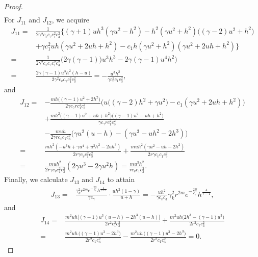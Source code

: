 \documentclass[10pt,a4paper]{amsart}
\begin{document}
\begin{proof}
\begin{align*}
\end{align*}
For $J_{11}$ and $J_{12}$, we acquire
\begin{align*}
J_{11}
=& \frac{1}{2\gamma^{2} c_v c_\gamma c_1^{2} c_3^{2}} \bigg\{
   (\gamma+1)uh^{3}(\gamma u^{2}-h^{2}) - h^{2}(\gamma u^{2}+h^{2})\big((\gamma-2)u^{2}+h^{2}\big) \\
& + \gamma c_1^{2} uh (\gamma u^{2}+2uh+h^{2}) - c_1 h (\gamma u^{2}+h^{2})(\gamma u^{2}+2uh+h^{2}) \bigg\} \\
=& \frac{1}{2\gamma^{2} c_v c_\gamma c_1^{2} c_3^{2}} \Big(
   2\gamma(\gamma-1))u^3 h^3 -2\gamma(\gamma-1)u^4 h^2 \Big) \\
=& \frac{2\gamma(\gamma-1)u^3 h^2(h - u)}{2\gamma^{2} c_v c_\gamma c_1^{2} c_3^{2}} = -\frac{u^3 h^2}{\gamma c_v^2 c_1 c_3^2},
\end{align*}
and
\begin{align*}
J_{12}
=& -\frac{mh\big((\gamma-1)u^{2}+2h^{2}\big)}{2\gamma c_\gamma r c_1^{2} c_3^{2}} \Big( u\big((\gamma-2)h^{2}+\gamma u^{2}\big)
- c_1(\gamma u^{2}+2uh+h^{2}) \Big) \\
& + \frac{mh^{2}\big((\gamma-1)u^{2}+uh+h^{2}\big)\big((\gamma-1)u^{2}-uh+h^{2}\big)}{\gamma c_\gamma r c_1^{2} c_3^{2}} \\
& - \frac{muh}{2\gamma r c_v c_1 c_3^{2}} \Big( \gamma u^{2}(u-h) - (\gamma u^{3}-uh^{2}-2h^{3}) \Big)\\
=&\frac{mh^2\left( -u^3 h + \gamma u^4 + u^2 h^2 - 2 u h^3 \right)}{2r\gamma c_v  c_1^{2} c_3^{2}}
+\frac{muh^2\left( \gamma u^2 - uh -2 h^2 \right)}{2r \gamma c_v c_1 c_3^2}\\
=&\frac{mu h^2 }{2r\gamma c_v c_1^2 c_3^2} ( 2\gamma u^3 - 2\gamma u^2 h )
= \frac{mu^3 h^2 }{r c_v c_1 c_3^2}.
\end{align*}
Finally, we calculate $J_{13}$ and $J_{14}$ to attain
\begin{align*}
J_{13}=& \frac{\gamma_k^2 r^{2m} e^{-\frac{2S}{c_\gamma}} h^{\frac{4}{\gamma-1}}}{\gamma c_{\gamma}}
\cdot \frac{u h^2 (1-\gamma)}{u+h} = -\frac{u h^2}{\gamma c_v c_3}\gamma_k^2 r^{2m} e^{-\frac{2S}{c_\gamma}} h^{\frac{4}{\gamma-1}},
\end{align*}
and
\begin{align*}
J_{14}
=& \frac{m^{2}uh\big[ (\gamma-1)u^{3}(u-h) - 2h^{3}(u-h) \big]}{2r^{2}c_1^{2} c_3^{2}}
   + \frac{m^{2}uh\big(2h^{3}-(\gamma-1)u^{3}\big)}{2r^{2} c_1 c_3^{2}} \\
=& \frac{m^{2}uh\,\big((\gamma-1)u^{3}-2h^{3}\big)}{2r^{2}c_1 c_3^{2}}
   - \frac{m^{2}uh\,\big((\gamma-1)u^{3}-2h^{3}\big)}{2r^{2}c_1 c_3^{2}}= 0.
\end{align*}


\end{proof}
\end{document}
